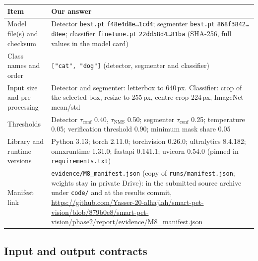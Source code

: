 \documentclass[11pt,a4paper]{article}
\newcommand{\tconf}{$\tau_{\text{conf}}$}
\newcommand{\tnms}{$\tau_{\text{NMS}}$}
\begin{document}
\begin{tabularx}{\linewidth}{@{}l Y@{}}
\toprule
Item & Our answer \\
\midrule
Model file(s) and checksum & Detector \texttt{best.pt} \texttt{f48e4d8e\ldots1cd4}; segmenter \texttt{best.pt} \texttt{868f3842\ldots d8ee}; classifier \texttt{finetune.pt} \texttt{22dd58d4\ldots81ba} (SHA-256, full values in the model card) \\
Class names and order & \texttt{["cat", "dog"]} (detector, segmenter and classifier) \\
Input size and pre-processing & Detector and segmenter: letterbox to 640\,px. Classifier: crop of the selected box, resize to 255\,px, centre crop 224\,px, ImageNet mean/std \\
Thresholds & Detector \tconf{} 0.40, \tnms{} 0.50; segmenter \tconf{} 0.25; temperature 0.05; verification threshold 0.90; minimum mask share 0.05 \\
Library and runtime versions & Python 3.13; torch 2.11.0; torchvision 0.26.0; ultralytics 8.4.182; onnxruntime 1.31.0; fastapi 0.141.1; uvicorn 0.54.0 (pinned in \texttt{requirements.txt}) \\
Manifest link & \texttt{evidence/M8\_manifest.json} (copy of \texttt{runs/manifest.json}; weights stay in private Drive): in the submitted source archive under \texttt{code/} and at the results commit, \url{https://github.com/Yasser-20-alhajlah/smart-pet-vision/blob/879b0e8/smart-pet-vision/phase2/report/evidence/M8_manifest.json} \\
\bottomrule
\end{tabularx}

\subsection{Input and output contracts}
\end{document}
